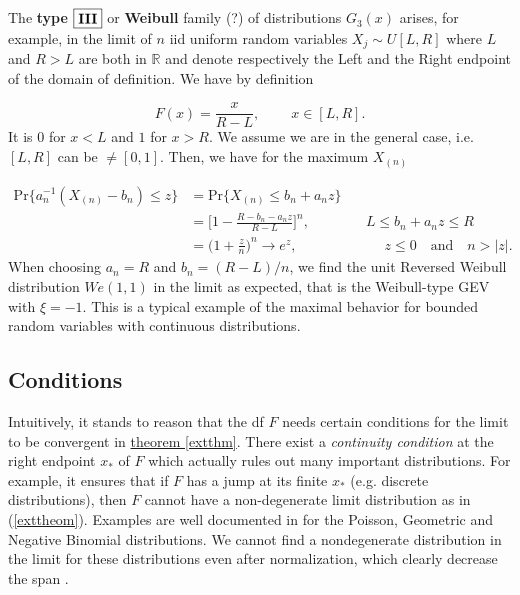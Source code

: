 \documentclass[11pt,a4paper,openany ]{book}
\begin{document}
The \textbf{type}  $\boxed{\textbf{\text{III}}}$ or \textbf{Weibull} family (?) of distributions $G_3(x)$ arises, for example, in the limit of $n$ iid uniform random variables $X_j\sim U[L,R]$ where $L$ and $R>L$ are both in $\mathbb{R}$  and denote respectively the Left and the Right endpoint of the domain of definition. We have by definition

\begin{equation*}
F(x)=\frac{x}{R-L}, \ \ \ \ \ \ \ \  \ \ x\in [L,R].
\end{equation*}
It is $0$ for $x<L$ and $1$ for $x>R$.
We assume we are in the general case, i.e. $[L,R]$ can be $\neq [0,1]$. Then, we have for the maximum $X_{(n)}$

\begin{equation*}
\begin{aligned}
\text{Pr}\{a_n^{-1}(X_{(n)}-b_n)\leq z\}
&=\text{Pr}\{X_{(n)}\leq b_n+a_nz\} \\
& = \bigg[1-\frac{R-b_n-a_nz}{R-L}\bigg]^n, \qquad\qquad L\leq b_n+a_nz\leq R \\ 
& = \Big(1+\frac{z}{n}\Big)^n\to e^z, \ \qquad \qquad\qquad  z\leq 0 \quad \text{and} \quad n>|z|.
\end{aligned}
\end{equation*}
When choosing $a_n=R$ and $b_n=(R-L)/n$, we find the unit Reversed Weibull distribution $We(1,1)$ in the limit as expected, that is the Weibull-type GEV with $\xi=-1$.
 This is a typical example of the maximal behavior for bounded random variables with
continuous distributions.


\subsection*{Conditions}

Intuitively, it stands to reason that the df $F$ needs certain conditions for the limit to be convergent in \hyperref[extthm]{theorem \ref{extthm}}. There exist a \emph{continuity condition} at the right endpoint $x_*$ of $F$ which actually rules out many important distributions. For example, it ensures that if $F$ has a jump at its finite $x_*$ (e.g. discrete distributions), then $F$ cannot have a non-degenerate limit distribution as in (\ref{exttheom}). Examples are well documented in \citet[section 3.1]{embrechts_modelling_2011} for the Poisson, Geometric and Negative Binomial distributions. We cannot find a nondegenerate distribution in the limit for these distributions even after normalization, which clearly decrease the span . 
\end{document}
